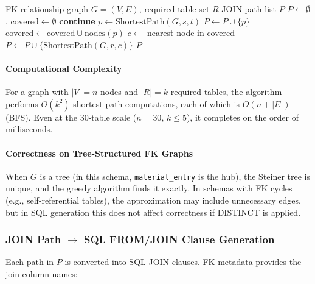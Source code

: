 \documentclass[5p,twocolumn]{elsarticle}
\begin{document}
\begin{algorithm}[htbp]
  \caption{Minimum-covering JOIN subgraph (Steiner tree approximation).}
  \label{alg:steiner}
  \begin{algorithmic}[1]
    \Require FK relationship graph $G = (V, E)$, required-table set $R$
    \Ensure JOIN path list $P$
    \State $P \gets \emptyset$, $\text{covered} \gets \emptyset$
        \State \textbf{continue} 
      \EndIf
      \State $p \gets \text{ShortestPath}(G, s, t)$ 
        \State $P \gets P \cup \{p\}$
        \State $\text{covered} \gets \text{covered} \cup \text{nodes}(p)$
      \EndIf
    \EndFor
     
      \State $c \gets $ nearest node in covered
      \State $P \gets P \cup \{\text{ShortestPath}(G, r, c)\}$
    \EndFor
    \State \Return $P$
  \end{algorithmic}
\end{algorithm}

\paragraph{Computational Complexity}
For a graph with $|V| = n$ nodes and $|R| = k$ required tables,
the algorithm performs $O(k^2)$ shortest-path computations, each of which is $O(n + |E|)$ (BFS).
Even at the 30-table scale ($n = 30$, $k \leq 5$), it completes on the order of milliseconds.

\paragraph{Correctness on Tree-Structured FK Graphs}
When $G$ is a tree (in this schema, \texttt{material\_entry} is the hub),
the Steiner tree is unique, and the greedy algorithm finds it exactly.
In schemas with FK cycles (e.g., self-referential tables), the approximation may include unnecessary edges,
but in SQL generation this does not affect correctness if DISTINCT is applied.

\subsubsection{JOIN Path $\to$ SQL FROM/JOIN Clause Generation}

Each path in $P$ is converted into SQL JOIN clauses.
FK metadata provides the join column names:
\end{document}
